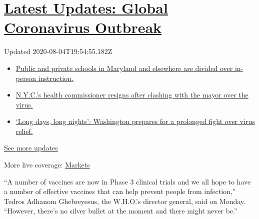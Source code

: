 \hypertarget{latest-updates-global-coronavirus-outbreak}{%
\section{\texorpdfstring{\href{https://www.nytimes3xbfgragh.onion/2020/08/04/world/coronavirus-cases.html?action=click\&pgtype=Article\&state=default\&region=MAIN_CONTENT_1\&context=storylines_live_updates}{Latest
Updates: Global Coronavirus
Outbreak}}{Latest Updates: Global Coronavirus Outbreak}}\label{latest-updates-global-coronavirus-outbreak}}

Updated 2020-08-04T19:54:55.182Z

\begin{itemize}
\tightlist
\item
  \href{https://www.nytimes3xbfgragh.onion/2020/08/04/world/coronavirus-cases.html?action=click\&pgtype=Article\&state=default\&region=MAIN_CONTENT_1\&context=storylines_live_updates\#link-4825b93}{Public
  and private schools in Maryland and elsewhere are divided over
  in-person instruction.}
\item
  \href{https://www.nytimes3xbfgragh.onion/2020/08/04/world/coronavirus-cases.html?action=click\&pgtype=Article\&state=default\&region=MAIN_CONTENT_1\&context=storylines_live_updates\#link-4d1eafa8}{N.Y.C.'s
  health commissioner resigns after clashing with the mayor over the
  virus.}
\item
  \href{https://www.nytimes3xbfgragh.onion/2020/08/04/world/coronavirus-cases.html?action=click\&pgtype=Article\&state=default\&region=MAIN_CONTENT_1\&context=storylines_live_updates\#link-6b644638}{`Long
  days, long nights': Washington prepares for a prolonged fight over
  virus relief.}
\end{itemize}

\href{https://www.nytimes3xbfgragh.onion/2020/08/04/world/coronavirus-cases.html?action=click\&pgtype=Article\&state=default\&region=MAIN_CONTENT_1\&context=storylines_live_updates}{See
more updates}

More live coverage:
\href{https://www.nytimes3xbfgragh.onion/live/2020/08/04/business/stock-market-today-coronavirus?action=click\&pgtype=Article\&state=default\&region=MAIN_CONTENT_1\&context=storylines_live_updates}{Markets}

``A number of vaccines are now in Phase 3 clinical trials and we all
hope to have a number of effective vaccines that can help prevent people
from infection,'' Tedros Adhanom Ghebreyesus, the W.H.O.'s director
general, said on Monday. ``However, there's no silver bullet at the
moment and there might never be.''

